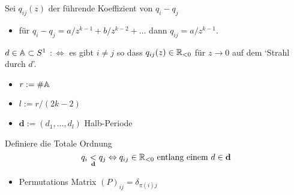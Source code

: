 \begin{defn}
  Sei $q_{ij}(z)$ der führende Koeffizient von $q_i-q_j$
  \begin{itemize}
    \item für $q_i-q_j=a/z^{k-1}+b/z^{k-2}+\dots$ dann $q_{ij}=a/z^{k-1}$.
  \end{itemize}
  $d\in\mathbb{A}\subset S^1$
  $:\Leftrightarrow{}$
  es gibt $i\neq j$ so dass $q_{ij}(z)\in\mathbb{R}_{<0}$ für $z\to0$ auf dem `Strahl
  durch $d$'.
\end{defn}
\begin{paracol}{2}
  \begin{defn}
    \begin{itemize}
      \item $r:=\#\mathbb{A}$
      \item $l:=r/(2k-2)$
      \item $\textbf{d}:=(d_1,\dots,d_l)$ Halb-Periode
    \end{itemize}
    Definiere die Totale Ordnung
    \[
      q_i\underset{\textbf{d}}{<}q_j\Leftrightarrow{}q_{ij}\in\mathbb{R}_{<0}\text{
      entlang einem } d\in\textbf{d}
    \]
    \begin{itemize}
      \item Permutations Matrix $(P)_{ij}=\delta_{\pi(i)j}$
    \end{itemize}
  \end{defn}
\switchcolumn
  \begin{center}
\end{center}
\end{paracol}
